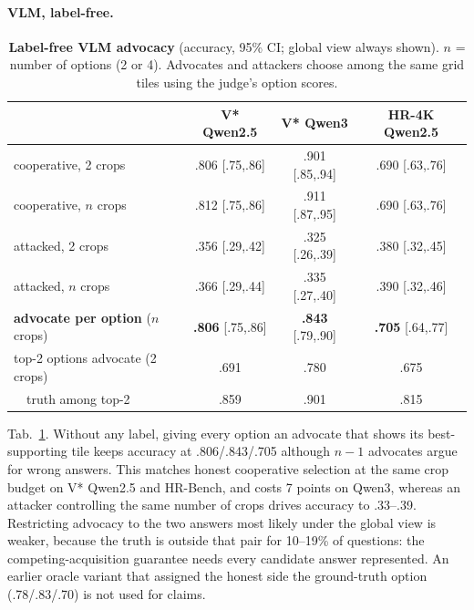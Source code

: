 \documentclass[10pt,twocolumn,letterpaper]{article}
\begin{document}
\paragraph{VLM, label-free.} \begin{table}[t]\centering\small
\caption{\textbf{Label-free VLM advocacy} (accuracy, 95\% CI; global view always shown). $n$ = number of options (2 or 4). Advocates and attackers choose among the same grid tiles using the judge's option scores.}\label{tab:vlmdeb}
\setlength{\tabcolsep}{2pt}
\begin{tabular}{@{}lccc@{}}\toprule
 & V* Qwen2.5 & V* Qwen3 & HR-4K Qwen2.5\\\midrule
cooperative, 2 crops & .806 {\tiny[.75,.86]} & .901 {\tiny[.85,.94]} & .690 {\tiny[.63,.76]}\\
cooperative, $n$ crops & .812 {\tiny[.75,.86]} & .911 {\tiny[.87,.95]} & .690 {\tiny[.63,.76]}\\
attacked, 2 crops & .356 {\tiny[.29,.42]} & .325 {\tiny[.26,.39]} & .380 {\tiny[.32,.45]}\\
attacked, $n$ crops & .366 {\tiny[.29,.44]} & .335 {\tiny[.27,.40]} & .390 {\tiny[.32,.46]}\\\midrule
\textbf{advocate per option} ($n$ crops) & \textbf{.806} {\tiny[.75,.86]} & \textbf{.843} {\tiny[.79,.90]} & \textbf{.705} {\tiny[.64,.77]}\\
top-2 options advocate (2 crops) & .691 & .780 & .675\\
\ \ truth among top-2 & .859 & .901 & .815\\\bottomrule
\end{tabular}\end{table}
Tab.~\ref{tab:vlmdeb}. Without any label, giving every option an advocate that shows its best-supporting tile keeps accuracy at .806/.843/.705 although $n{-}1$ advocates argue for wrong answers. This matches honest cooperative selection at the same crop budget on V* Qwen2.5 and HR-Bench, and costs 7 points on Qwen3, whereas an attacker controlling the same number of crops drives accuracy to .33--.39. Restricting advocacy to the two answers most likely under the global view is weaker, because the truth is outside that pair for 10--19\% of questions: the competing-acquisition guarantee needs every candidate answer represented. An earlier oracle variant that assigned the honest side the ground-truth option (.78/.83/.70) is not used for claims.

\end{document}

